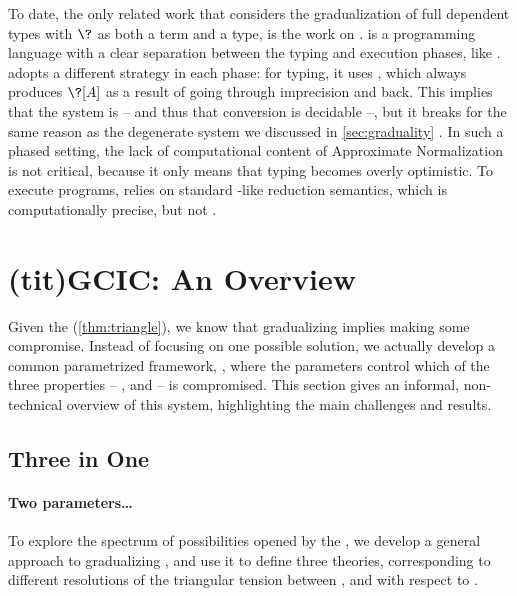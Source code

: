 To date, the only related work that considers the gradualization of full dependent types with
$\?$ as both a term and a type, is the work on  .
 is a programming language with a clear separation between the typing and execution 
phases, like  .
 adopts a different strategy in each phase:
for typing, it uses , which always produces $\?[A]$ as a result
of going through imprecision and back. This implies that the system is  – and thus that conversion is decidable –, but it breaks  for the same reason as the
degenerate system we discussed in \cref{sec:graduality}%
.
In such a phased setting, the lack of computational content of Approximate Normalization is not
critical, because it only means that typing becomes overly optimistic.
To execute programs,  relies on standard -like reduction semantics,
which is computationally precise, but not .

\section{\kl(tit){GCIC}: An Overview}
\label{sec:gcic-overview}

Given the  (\cref{thm:triangle}),
we know that gradualizing  implies making some compromise.
Instead of focusing on one possible solution, we actually develop
a common parametrized framework, , where the parameters control
which of the three properties – ,  and  –
is compromised. 
This section gives an informal, non-technical overview of this system,
highlighting the main challenges and results.

\subsection{Three in One}
\label{sec:gcic:-3-1}

\paragraph{Two parameters…}

To explore the spectrum of possibilities opened by the ,
we develop a general approach to gradualizing , and use it to define three theories, corresponding to different resolutions of the triangular tension between ,  and  with respect to .

